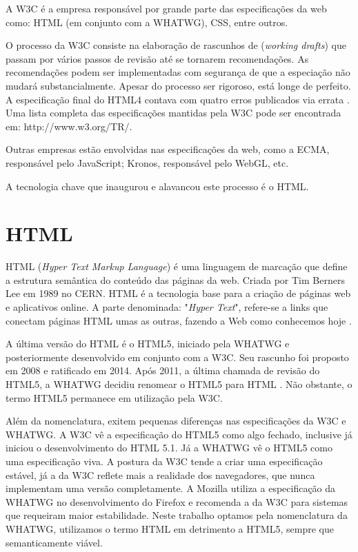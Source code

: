 A W3C é a empresa responsável por grande parte das especificações
da web como: HTML (em conjunto com a WHATWG), CSS, entre outros.

O processo da W3C consiste na elaboração de rascunhos de
(\textit{working drafts}) que passam por vários passos de revisão até
se tornarem recomendações. As recomendações podem ser implementadas
com segurança de que a especiação não mudará substancialmente.
Apesar do processo ser rigoroso, está longe de perfeito. A
especificação final do HTML4 contava com quatro erros publicados
via errata \autocite{HTML5}. Uma lista completa das especificações
mantidas pela W3C pode ser encontrada em: http://www.w3.org/TR/.

Outras empresas estão envolvidas nas especificações da web, como a
ECMA, responsável pelo JavaScript; Kronos, responsável pelo WebGL,
etc.

A tecnologia chave que inaugurou e alavancou este processo é o HTML.
\section{HTML}

HTML (\textit{Hyper Text Markup Language}) é uma linguagem de
marcação que define a estrutura semântica do conteúdo das páginas
da web. Criada por Tim Berners Lee em 1989 no CERN. HTML é a tecnologia
base para a criação de páginas web e aplicativos online. A parte
denominada: "\textit{Hyper Text}", refere-se a links que conectam
páginas HTML umas as outras, fazendo a Web como conhecemos hoje
\autocite{mdn2015}.

A última versão do HTML é o HTML5, iniciado pela WHATWG e
posteriormente desenvolvido em conjunto com a W3C. Seu rascunho foi
proposto em 2008 e ratificado em 2014. Após 2011, a última chamada
de revisão do HTML5, a WHATWG decidiu renomear o HTML5 para HTML
\autocite{htmlIsTheNewHtml5}. Não obstante, o termo HTML5 permanece em
utilização pela W3C.

Além da nomenclatura, exitem pequenas diferenças nas especificações
da W3C e WHATWG. A W3C vê a especificação do HTML5 como algo fechado,
inclusive já iniciou o desenvolvimento do HTML 5.1. Já a WHATWG vê o
HTML5 como uma especificação viva. A postura da W3C tende a criar uma
especificação estável, já a da W3C reflete mais a realidade dos
navegadores, que nunca implementam uma versão completamente. A Mozilla
utiliza a especificação da WHATWG no desenvolvimento do Firefox e
recomenda a da W3C para sistemas que requeiram maior estabilidade. Neste
trabalho optamos pela nomenclatura da WHATWG, utilizamos o termo HTML em
detrimento a HTML5, sempre que semanticamente viável.

